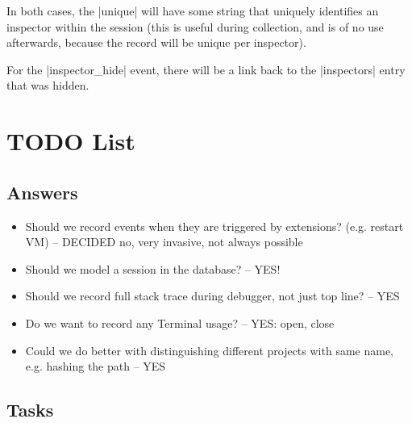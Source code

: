 \documentclass{book}
\begin{document}
In both cases, the |unique| will have some string that uniquely identifies an
inspector within the session (this is useful during collection, and is of no
use afterwards, because the record will be unique per inspector).

For the |inspector_hide| event, there will be a link back to the |inspectors|
entry that was hidden.

\chapter{TODO List}

\section{Answers}

\begin{itemize}
\item Should we record events when they are triggered by extensions?
  (e.g. restart VM) -- DECIDED no, very invasive, not always possible
\item Should we model a session in the database? -- YES!
\item Should we record full stack trace during debugger, not just top line? -- YES
\item Do we want to record any Terminal usage? -- YES: open, close
\item Could we do better with distinguishing different projects with same
  name, e.g. hashing the path -- YES
\end{itemize}

\section{Tasks}
\end{document}
